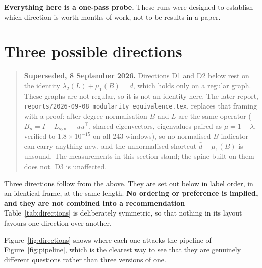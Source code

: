 \documentclass[11pt,a4paper]{article}
\begin{document}
\textbf{Everything here is a one-pass probe.} These runs were designed to
establish which direction is worth months of work, not to be results in a paper.

\section{Three possible directions}
\label{sec:directions}

\begin{quote}\small\textbf{Superseded, 8 September 2026.} Directions D1 and D2 below
rest on the identity $\lambda_2(L)+\mu_1(B)=d$, which holds only on a regular graph.
These graphs are not regular, so it is not an identity here. The later report,
\texttt{reports/2026-09-08\_modularity\_equivalence.tex}, replaces that framing with a
proof: after degree normalisation $B$ and $L$ are the same operator
($B_n=I-L_{\mathrm{sym}}-uu^{\!\top}$, shared eigenvectors, eigenvalues paired as
$\mu=1-\lambda$, verified to $1.8\times10^{-15}$ on all 243 windows), so no
normalised-$B$ indicator can carry anything new, and the unnormalised shortcut
$\bar d-\mu_1(B)$ is unsound. The measurements in this section stand; the spine built
on them does not. D3 is unaffected.\end{quote}

Three directions follow from the above. They are set out below in label order,
in an identical frame, at the same length. \textbf{No ordering or preference is
implied, and they are not combined into a recommendation} ---
Table~\ref{tab:directions} is deliberately symmetric, so that nothing in its
layout favours one direction over another.

Figure~\ref{fig:directions} shows where each one attacks the pipeline of
Figure~\ref{fig:pipeline}, which is the clearest way to see that they are
genuinely different questions rather than three versions of one.
\end{document}

